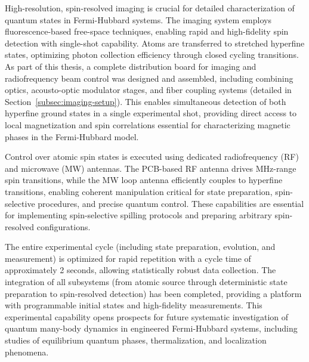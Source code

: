 High-resolution, spin-resolved imaging is crucial for detailed characterization of quantum states in Fermi-Hubbard systems. The imaging system employs fluorescence-based free-space techniques, enabling rapid and high-fidelity spin detection with single-shot capability. Atoms are transferred to stretched hyperfine states, optimizing photon collection efficiency through closed cycling transitions. As part of this thesis, a complete distribution board for imaging and radiofrequency beam control was designed and assembled, including combining optics, acousto-optic modulator stages, and fiber coupling systems (detailed in Section~\ref{subsec:imaging-setup}). This enables simultaneous detection of both hyperfine ground states in a single experimental shot, providing direct access to local magnetization and spin correlations essential for characterizing magnetic phases in the Fermi-Hubbard model.

Control over atomic spin states is executed using dedicated radiofrequency (RF) and microwave (MW) antennas. The PCB-based RF antenna drives MHz-range spin transitions, while the MW loop antenna efficiently couples to hyperfine transitions, enabling coherent manipulation critical for state preparation, spin-selective procedures, and precise quantum control. These capabilities are essential for implementing spin-selective spilling protocols and preparing arbitrary spin-resolved configurations.

The entire experimental cycle (including state preparation, evolution, and measurement) is optimized for rapid repetition with a cycle time of approximately 2 seconds, allowing statistically robust data collection. The integration of all subsystems (from atomic source through deterministic state preparation to spin-resolved detection) has been completed, providing a platform with programmable initial states and high-fidelity measurements. This experimental capability opens prospects for future systematic investigation of quantum many-body dynamics in engineered Fermi-Hubbard systems, including studies of equilibrium quantum phases, thermalization, and localization phenomena.